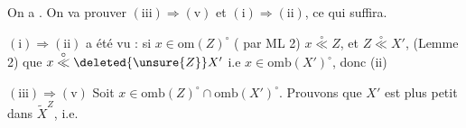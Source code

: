 On a
. On va prouver $(\mathrm{iii})\Longrightarrow(\mathrm{v})$ et $(\mathrm{i})\Longrightarrow(\mathrm{ii})$, ce qui suffira.

$(\mathrm{i})\Longrightarrow(\mathrm{ii})$ a été vu : si $x\in\mathrm{om}(Z)^\circ$ ( par ML 2)  $x\overset{\circ}{\ll}Z$, et $Z\overset{\circ}{\ll}X'$,   (Lemme 2) que $x\overset{\circ}{\ll}\deleted{\unsure{Z}}X'$ i.e $x\in\mathrm{omb}(X')^\circ$, donc (ii)

$(\mathrm{iii})\Longrightarrow(\mathrm{v})$ Soit $x\in\mathrm{omb}(Z)^\circ\cap\mathrm{omb}(X')^\circ$. Prouvons que $X'$ est plus petit dans $\widetilde X^{Z}$, i.e.
